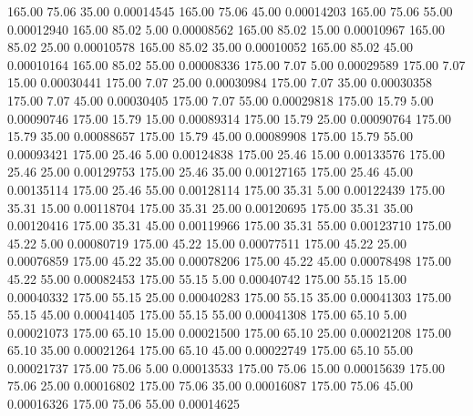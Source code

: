     165.00     75.06     35.00     0.00014545
    165.00     75.06     45.00     0.00014203
    165.00     75.06     55.00     0.00012940
    165.00     85.02      5.00     0.00008562
    165.00     85.02     15.00     0.00010967
    165.00     85.02     25.00     0.00010578
    165.00     85.02     35.00     0.00010052
    165.00     85.02     45.00     0.00010164
    165.00     85.02     55.00     0.00008336
    175.00      7.07      5.00     0.00029589
    175.00      7.07     15.00     0.00030441
    175.00      7.07     25.00     0.00030984
    175.00      7.07     35.00     0.00030358
    175.00      7.07     45.00     0.00030405
    175.00      7.07     55.00     0.00029818
    175.00     15.79      5.00     0.00090746
    175.00     15.79     15.00     0.00089314
    175.00     15.79     25.00     0.00090764
    175.00     15.79     35.00     0.00088657
    175.00     15.79     45.00     0.00089908
    175.00     15.79     55.00     0.00093421
    175.00     25.46      5.00     0.00124838
    175.00     25.46     15.00     0.00133576
    175.00     25.46     25.00     0.00129753
    175.00     25.46     35.00     0.00127165
    175.00     25.46     45.00     0.00135114
    175.00     25.46     55.00     0.00128114
    175.00     35.31      5.00     0.00122439
    175.00     35.31     15.00     0.00118704
    175.00     35.31     25.00     0.00120695
    175.00     35.31     35.00     0.00120416
    175.00     35.31     45.00     0.00119966
    175.00     35.31     55.00     0.00123710
    175.00     45.22      5.00     0.00080719
    175.00     45.22     15.00     0.00077511
    175.00     45.22     25.00     0.00076859
    175.00     45.22     35.00     0.00078206
    175.00     45.22     45.00     0.00078498
    175.00     45.22     55.00     0.00082453
    175.00     55.15      5.00     0.00040742
    175.00     55.15     15.00     0.00040332
    175.00     55.15     25.00     0.00040283
    175.00     55.15     35.00     0.00041303
    175.00     55.15     45.00     0.00041405
    175.00     55.15     55.00     0.00041308
    175.00     65.10      5.00     0.00021073
    175.00     65.10     15.00     0.00021500
    175.00     65.10     25.00     0.00021208
    175.00     65.10     35.00     0.00021264
    175.00     65.10     45.00     0.00022749
    175.00     65.10     55.00     0.00021737
    175.00     75.06      5.00     0.00013533
    175.00     75.06     15.00     0.00015639
    175.00     75.06     25.00     0.00016802
    175.00     75.06     35.00     0.00016087
    175.00     75.06     45.00     0.00016326
    175.00     75.06     55.00     0.00014625
